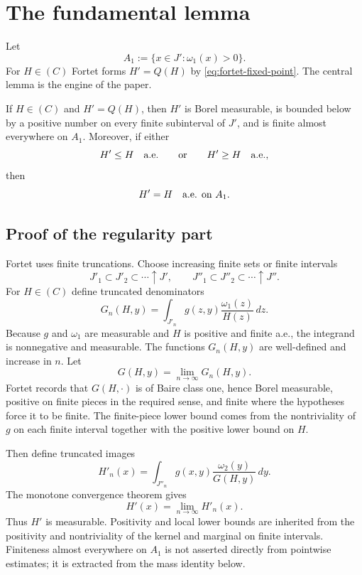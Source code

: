 \section{The fundamental lemma}
Let
\[
  A_1:=\{x\in J': \omega_1(x)>0\}.
\]
For $H\in(C)$ Fortet forms $H'=Q(H)$ by \eqref{eq:fortet-fixed-point}.  The central lemma is the engine of the paper.

\begin{lemma}
If $H\in(C)$ and $H'=Q(H)$, then $H'$ is Borel measurable, is bounded below by a positive number on every finite subinterval of $J'$, and is finite almost everywhere on $A_1$.  Moreover, if either
\[
  H'\le H \quad\hbox{a.e.}
  \qquad\hbox{or}\qquad
  H'\ge H \quad\hbox{a.e.},
\]
then
\[
  H'=H \quad\hbox{a.e. on } A_1.
\]
\end{lemma}

\subsection{Proof of the regularity part}
Fortet uses finite truncations.  Choose increasing finite sets or finite intervals
\[
  J'_1\subset J'_2\subset\cdots\uparrow J',
  \qquad
  J''_1\subset J''_2\subset\cdots\uparrow J''.
\]
For $H\in(C)$ define truncated denominators
\[
  G_n(H,y)=\int_{J'_n} g(z,y)\frac{\omega_1(z)}{H(z)}\,dz.
\]
Because $g$ and $\omega_1$ are measurable and $H$ is positive and finite a.e., the integrand is nonnegative and measurable.  The functions $G_n(H,y)$ are well-defined and increase in $n$.
Let
\[
  G(H,y)=\lim_{n\to\infty}G_n(H,y).
\]
Fortet records that $G(H,\cdot)$ is of Baire class one, hence Borel measurable, positive on finite pieces in the required sense, and finite where the hypotheses force it to be finite.  The finite-piece lower bound comes from the nontriviality of $g$ on each finite interval together with the positive lower bound on $H$.

Then define truncated images
\[
  H'_n(x)=\int_{J''_n} g(x,y)\frac{\omega_2(y)}{G(H,y)}\,dy.
\]
The monotone convergence theorem gives
\[
  H'(x)=\lim_{n\to\infty}H'_n(x).
\]
Thus $H'$ is measurable.  Positivity and local lower bounds are inherited
from the positivity and nontriviality of the kernel and marginal on finite
intervals.  Finiteness almost everywhere on $A_1$ is not asserted directly
from pointwise estimates; it is extracted from the mass identity below.

